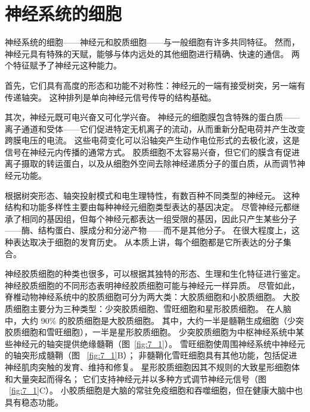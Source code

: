 \chapter{神经系统的细胞} \label{chap:chap7}

神经系统的细胞——神经元和胶质细胞——与一般细胞有许多共同特征。
然而，神经元具有特殊的天赋，能够与体内远处的其他细胞进行精确、快速的通信。
两个特征赋予了神经元这种能力。


首先，它们具有高度的形态和功能不对称性：神经元的一端有接受树突，另一端有传递轴突。
这种排列是单向神经元信号传导的结构基础。


其次，神经元既可电兴奋又可化学兴奋。
神经元的细胞膜包含特殊的蛋白质——离子通道和受体——它们促进特定无机离子的流动，从而重新分配电荷并产生改变跨膜电压的电流。
这些电荷变化可以沿轴突产生动作电位形式的去极化波，这是信号在神经元内传播的通常方式。
胶质细胞不太容易兴奋，但它们的膜含有促进离子摄取的转运蛋白，以及从细胞外空间去除神经递质分子的蛋白质，从而调节神经元功能。


根据树突形态、轴突投射模式和电生理特性，有数百种不同类型的神经元。
这种结构和功能多样性主要由每种神经元细胞类型表达的基因决定。
尽管神经元都继承了相同的基因组，但每个神经元都表达一组受限的基因，因此只产生某些分子——酶、结构蛋白、膜成分和分泌产物——而不是其他分子。
在很大程度上，这种表达取决于细胞的发育历史。
从本质上讲，每个细胞都是它所表达的分子集合。


神经胶质细胞的种类也很多，可以根据其独特的形态、生理和生化特征进行鉴定。
神经胶质细胞的不同形态表明神经胶质细胞可能与神经元一样异质。
尽管如此，脊椎动物神经系统中的胶质细胞可分为两大类：大胶质细胞和小胶质细胞。
大胶质细胞主要分为三种类型：少突胶质细胞、雪旺细胞和星形胶质细胞。
在人脑中，大约 90\% 的胶质细胞是大胶质细胞。
其中，大约一半是髓鞘生成细胞（少突胶质细胞和雪旺细胞），一半是星形胶质细胞。
少突胶质细胞为中枢神经系统中某些神经元的轴突提供绝缘髓鞘（图~\ref{fig:7_1}）。 
雪旺细胞使周围神经系统中神经元的轴突形成髓鞘（图 ~\ref{fig:7_1}B）；
非髓鞘化雪旺细胞具有其他功能，包括促进神经肌肉突触的发育、维持和修复。
星形胶质细胞因其不规则的大致星形细胞体和大量突起而得名；
它们支持神经元并以多种方式调节神经元信号（图 ~\ref{fig:7_1}C）。 
小胶质细胞是大脑的常驻免疫细胞和吞噬细胞，但在健康大脑中也具有稳态功能。


